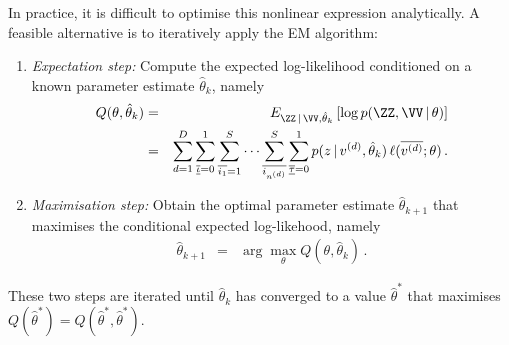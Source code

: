 \documentclass[a4paper]{article}
\newcommand{\ui}{\underline{\iota}}
\newcommand{\ut}{\underline{\tau}}
\begin{document}
In practice, it is difficult to optimise this nonlinear expression analytically. A feasible alternative is to iteratively apply the
EM algorithm:
\begin{enumerate}
\item {\em Expectation step:} Compute the expected log-likelihood conditioned on a known parameter estimate $\hat{\theta}_k$,
namely
\begin{eqnarray}
  Q(\theta,\hat{\theta}_k) & = & E_{\ZZ\,|\,\VV,\hat{\theta}_k}\left[\log p(\ZZ,\VV\,|\,\theta)\right]
\nonumber\\& = &
\sum_{d=1}^D \sum_{\overline{\ui}=0}^{1}\sum_{\overline{i_1}=1}^{S}\cdots\sum_{\overline{i_{n^{(d)}}}}^{S}
\sum_{\overline{\ut}=0}^{1}
p(z\,|\,v^{(d)},\hat{\theta}_k) 
\,\ell(\overline{v^{(d)}};\theta)
\,.
\end{eqnarray}

\item {\em Maximisation step:} Obtain the optimal parameter estimate $\hat{\theta}_{k+1}$ that maximises the
conditional expected log-likehood, namely
\begin{eqnarray}
\hat{\theta}_{k+1} & = & \arg\max_{\theta} Q(\theta,\hat{\theta}_k)\,.
\end{eqnarray}
\end{enumerate}
These two steps are iterated until $\hat{\theta}_k$ has converged to a value $\hat{\theta}^*$ that maximises 
$Q(\hat{\theta}^*)=Q(\hat{\theta}^*,\hat{\theta}^*)$.
\end{document}
